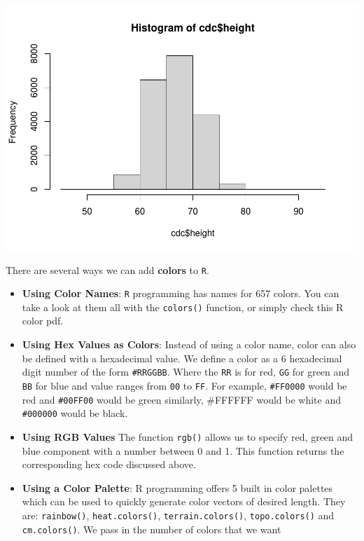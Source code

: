 \documentclass[
]{book}
\begin{document}
\includegraphics{_main_files/figure-latex/unnamed-chunk-170-1.pdf}

There are several ways we can add \textbf{colors} to \texttt{R}.

\begin{itemize}
\item
  \textbf{Using Color Names}: \texttt{R} programming has names for 657 colors. You can take a look at them all with the \texttt{colors()} function, or simply check this R color pdf.
\item
  \textbf{Using Hex Values as Colors}: Instead of using a color name, color can also be defined with a hexadecimal value. We define a color as a 6 hexadecimal digit number of the form \texttt{\#RRGGBB}. Where the \texttt{RR} is for red, \texttt{GG} for green and \texttt{BB} for blue and value ranges from \texttt{00} to \texttt{FF}. For example, \texttt{\#FF0000} would be red and \texttt{\#00FF00} would be green similarly, \#FFFFFF would be white and \texttt{\#000000} would be black.
\item
  \textbf{Using RGB Values} The function \texttt{rgb()} allows us to specify red, green and blue component with a number between 0 and 1. This function returns the corresponding hex code discussed above.
\item
  \textbf{Using a Color Palette}: R programming offers 5 built in color palettes which can be used to quickly generate color vectors of desired length. They are: \texttt{rainbow()}, \texttt{heat.colors()}, \texttt{terrain.colors()}, \texttt{topo.colors()} and \texttt{cm.colors()}. We pass in the number of colors that we want
\end{itemize}
\end{document}
